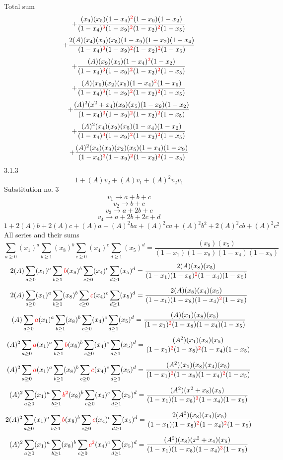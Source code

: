 \documentclass{article}
\begin{document}
Total sum
\[+\frac{(x_9)(x_5)(1-x_4)^{\textcolor{red}{2}}(1-x_9)(1-x_2)}{(1-x_4)^{\textcolor{red}{3}}(1-x_9)^{\textcolor{red}{2}}(1-x_2)^{\textcolor{red}{2}}(1-x_5)}\]\[+\frac{2(A)(x_4)(x_9)(x_5)(1-x_9)(1-x_2)(1-x_4)}{(1-x_4)^{\textcolor{red}{3}}(1-x_9)^{\textcolor{red}{2}}(1-x_2)^{\textcolor{red}{2}}(1-x_5)}\]\[+\frac{(A)(x_9)(x_5)(1-x_4)^{\textcolor{red}{2}}(1-x_2)}{(1-x_4)^{\textcolor{red}{3}}(1-x_9)^{\textcolor{red}{2}}(1-x_2)^{\textcolor{red}{2}}(1-x_5)}\]\[+\frac{(A)(x_9)(x_2)(x_5)(1-x_4)^{\textcolor{red}{2}}(1-x_9)}{(1-x_4)^{\textcolor{red}{3}}(1-x_9)^{\textcolor{red}{2}}(1-x_2)^{\textcolor{red}{2}}(1-x_5)}\]\[+\frac{(A)^{2}(x^{2}+x_4)(x_9)(x_5)(1-x_9)(1-x_2)}{(1-x_4)^{\textcolor{red}{3}}(1-x_9)^{\textcolor{red}{2}}(1-x_2)^{\textcolor{red}{2}}(1-x_5)}\]\[+\frac{(A)^{2}(x_4)(x_9)(x_5)(1-x_4)(1-x_2)}{(1-x_4)^{\textcolor{red}{3}}(1-x_9)^{\textcolor{red}{2}}(1-x_2)^{\textcolor{red}{2}}(1-x_5)}\]\[+\frac{(A)^{2}(x_4)(x_9)(x_2)(x_5)(1-x_4)(1-x_9)}{(1-x_4)^{\textcolor{red}{3}}(1-x_9)^{\textcolor{red}{2}}(1-x_2)^{\textcolor{red}{2}}(1-x_5)}\]
3.1.3
\[1+(A)v_2+(A)v_1+(A)^2v_2v_1\]Substitution no. 3\[v_1\rightarrow{a+b+c}\]\[v_2\rightarrow{b+c}\]\[v_3\rightarrow{a+2b+c}\]\[v_4\rightarrow{a+2b+2c+d}\]\[1+2(A)b+2(A)c+(A)a+(A)^2ba+(A)^2ca+(A)^2b^{2}+2(A)^2cb+(A)^2c^{2}\]All series and their sums\[\sum_{a\geq{0}}(x_1)^{a}\sum_{b\geq{1}}(x_8)^{b}\sum_{c\geq{0}}(x_4)^{c}\sum_{d\geq{1}}(x_5)^{d}=\frac{(x_8)(x_5)}{(1-x_1)(1-x_8)(1-x_4)(1-x_5)}\]\[2(A)\sum_{a\geq{0}}(x_1)^{a}\sum_{b\geq{1}}\textcolor{red}{b}(x_8)^{b}\sum_{c\geq{0}}(x_4)^{c}\sum_{d\geq{1}}(x_5)^{d}=\frac{2(A)(x_8)(x_5)}{(1-x_1)(1-x_8)^{\textcolor{red}{2}}(1-x_4)(1-x_5)}\]\[2(A)\sum_{a\geq{0}}(x_1)^{a}\sum_{b\geq{1}}(x_8)^{b}\sum_{c\geq{0}}\textcolor{red}{c}(x_4)^{c}\sum_{d\geq{1}}(x_5)^{d}=\frac{2(A)(x_8)(x_4)(x_5)}{(1-x_1)(1-x_8)(1-x_4)^{\textcolor{red}{2}}(1-x_5)}\]\[(A)\sum_{a\geq{0}}\textcolor{red}{a}(x_1)^{a}\sum_{b\geq{1}}(x_8)^{b}\sum_{c\geq{0}}(x_4)^{c}\sum_{d\geq{1}}(x_5)^{d}=\frac{(A)(x_1)(x_8)(x_5)}{(1-x_1)^{\textcolor{red}{2}}(1-x_8)(1-x_4)(1-x_5)}\]\[(A)^{2}\sum_{a\geq{0}}\textcolor{red}{a}(x_1)^{a}\sum_{b\geq{1}}\textcolor{red}{b}(x_8)^{b}\sum_{c\geq{0}}(x_4)^{c}\sum_{d\geq{1}}(x_5)^{d}=\frac{(A^{2})(x_1)(x_8)(x_5)}{(1-x_1)^{\textcolor{red}{2}}(1-x_8)^{\textcolor{red}{2}}(1-x_4)(1-x_5)}\]\[(A)^{2}\sum_{a\geq{0}}\textcolor{red}{a}(x_1)^{a}\sum_{b\geq{1}}(x_8)^{b}\sum_{c\geq{0}}\textcolor{red}{c}(x_4)^{c}\sum_{d\geq{1}}(x_5)^{d}=\frac{(A^{2})(x_1)(x_8)(x_4)(x_5)}{(1-x_1)^{\textcolor{red}{2}}(1-x_8)(1-x_4)^{\textcolor{red}{2}}(1-x_5)}\]\[(A)^{2}\sum_{a\geq{0}}(x_1)^{a}\sum_{b\geq{1}}\textcolor{red}{b^{2}}(x_8)^{b}\sum_{c\geq{0}}(x_4)^{c}\sum_{d\geq{1}}(x_5)^{d}=\frac{(A^{2})(x^{2}+x_8)(x_5)}{(1-x_1)(1-x_8)^{\textcolor{red}{3}}(1-x_4)(1-x_5)}\]\[2(A)^{2}\sum_{a\geq{0}}(x_1)^{a}\sum_{b\geq{1}}\textcolor{red}{b}(x_8)^{b}\sum_{c\geq{0}}\textcolor{red}{c}(x_4)^{c}\sum_{d\geq{1}}(x_5)^{d}=\frac{2(A^{2})(x_8)(x_4)(x_5)}{(1-x_1)(1-x_8)^{\textcolor{red}{2}}(1-x_4)^{\textcolor{red}{2}}(1-x_5)}\]\[(A)^{2}\sum_{a\geq{0}}(x_1)^{a}\sum_{b\geq{1}}(x_8)^{b}\sum_{c\geq{0}}\textcolor{red}{c^{2}}(x_4)^{c}\sum_{d\geq{1}}(x_5)^{d}=\frac{(A^{2})(x_8)(x^{2}+x_4)(x_5)}{(1-x_1)(1-x_8)(1-x_4)^{\textcolor{red}{3}}(1-x_5)}\]
\end{document}
